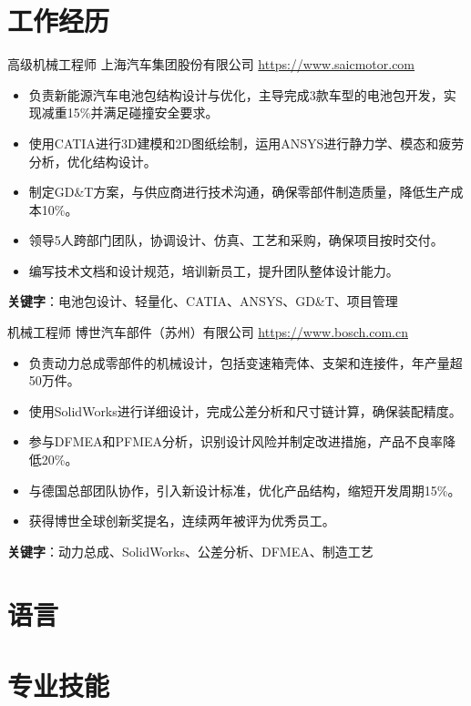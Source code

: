 \documentclass[a4paper, serif, 10pt]{moderncv}
\begin{document}
\section{工作经历}

        {高级机械工程师}
        {上海汽车集团股份有限公司}
        {\url{https://www.saicmotor.com}}
        {}
        {\begin{itemize}
\item 负责新能源汽车电池包结构设计与优化，主导完成3款车型的电池包开发，实现减重15\%并满足碰撞安全要求。
\item 使用CATIA进行3D建模和2D图纸绘制，运用ANSYS进行静力学、模态和疲劳分析，优化结构设计。
\item 制定GD\&T方案，与供应商进行技术沟通，确保零部件制造质量，降低生产成本10\%。
\item 领导5人跨部门团队，协调设计、仿真、工艺和采购，确保项目按时交付。
\item 编写技术文档和设计规范，培训新员工，提升团队整体设计能力。
\end{itemize}
\textbf{关键字}：电池包设计、轻量化、CATIA、ANSYS、GD\&T、项目管理}

        {机械工程师}
        {博世汽车部件（苏州）有限公司}
        {\url{https://www.bosch.com.cn}}
        {}
        {\begin{itemize}
\item 负责动力总成零部件的机械设计，包括变速箱壳体、支架和连接件，年产量超50万件。
\item 使用SolidWorks进行详细设计，完成公差分析和尺寸链计算，确保装配精度。
\item 参与DFMEA和PFMEA分析，识别设计风险并制定改进措施，产品不良率降低20\%。
\item 与德国总部团队协作，引入新设计标准，优化产品结构，缩短开发周期15\%。
\item 获得博世全球创新奖提名，连续两年被评为优秀员工。
\end{itemize}
\textbf{关键字}：动力总成、SolidWorks、公差分析、DFMEA、制造工艺}
\section{语言}

\section{专业技能}
\end{document}
